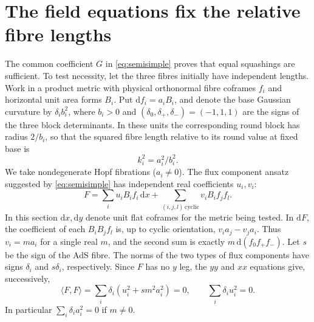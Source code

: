 \documentclass[11pt,a4paper]{article}
\numberwithin{equation}{section}
\newcommand{\dd}{\mathrm{d}}
\begin{document}
\section{The field equations fix the relative fibre lengths}\label{sec:constraints}

The common coefficient $G$ in \eqref{eq:semisimple} proves that equal squashings are sufficient. To test necessity, let the three fibres initially have independent lengths. Work in a product metric with physical orthonormal fibre coframes $f_i$ and horizontal unit area forms $B_i$. Put $\dd f_i=a_iB_i$, and denote the base Gaussian curvature by $\delta_i b_i^2$, where $b_i>0$ and $(\delta_0,\delta_+,\delta_-)=(-1,1,1)$ are the signs of the three block determinants. In these units the corresponding round block has radius $2/b_i$, so that the squared fibre length relative to its round value at fixed base is
\begin{equation*}
 k_i^2=a_i^2/b_i^2 .
\end{equation*}
We take nondegenerate Hopf fibrations ($a_i\ne0$). The flux component ansatz suggested by \eqref{eq:semisimple} has independent real coefficients $u_i,v_i$:
\begin{equation}
 F=\sum_i u_i B_i f_i\,\dd x+\sum_{(i,j,l)\,\mathrm{cyclic}}v_i B_i f_j f_l .\label{eq:ansatz}
\end{equation}
In this section $\dd x,\dd y$ denote unit flat coframes for the metric being tested. In $\dd F$, the coefficient of each $B_iB_j f_l$ is, up to cyclic orientation, $v_i a_j-v_j a_i$. Thus $v_i=m a_i$ for a single real $m$, and the second sum is exactly $m\,\dd(f_0f_+f_-)$. Let $s$ be the sign of the AdS fibre. The norms of the two types of flux components have signs $\delta_i$ and $s\delta_i$, respectively. Since $F$ has no $y$ leg, the $yy$ and $xx$ equations give, successively,
\begin{equation}
 \langle F,F\rangle=\sum_i\delta_i(u_i^2+s m^2 a_i^2)=0,\qquad \sum_i\delta_i u_i^2=0 .\label{eq:traces}
\end{equation}
In particular $\sum_i\delta_i a_i^2=0$ if $m\ne0$.
\end{document}
